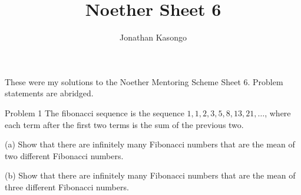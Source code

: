 \documentclass{article}
\author{Jonathan Kasongo}
\title{Noether Sheet 6}
\begin{document}
\maketitle
\centerline{
These were my solutions to the Noether Mentoring Scheme Sheet 6. Problem
statements are abridged.
}

\begin{problem}{Problem 1}
The fibonacci sequence is the sequence $1,1,2,3,5,8,13,21,\ldots$, where
each term after the first two terms is the sum of the previous two.
\vspace{0.2cm}

(a) Show that there are infinitely many Fibonacci numbers that are the
mean of two different Fibonacci numbers.
\vspace{0.2cm}

(b) Show that there are infinitely many Fibonacci numbers that are the mean
of three different Fibonacci numbers.
\end{problem}
\end{document}
